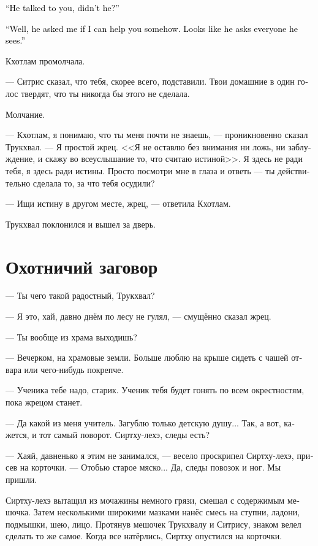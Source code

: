\documentclass[a4paper,12pt,fleqn]{book}\usepackage{cooltooltips}\usepackage{polyglossia}\setdefaultlanguage{russian}\setotherlanguage{english}\defaultfontfeatures{Ligatures=TeX,Mapping=tex-text} \usepackage{xcolor}\definecolor{lightgray}{HTML}{bbbbbb}\color{lightgray}\newcommand{\ml}[3]{\textenglish{\textcolor{black}{#3}}}
\begin{document}
\ml{$0$}
{--- Он с тобой говорил, да?}
{``He talked to you, didn't he?''}

\ml{$0$}
{--- Хай, он спросил, не могу ли я тебе как-то помочь.}
{``Well, he asked me if I can help you somehow.}
\ml{$0$}
{Похоже, он у всех прохожих это спрашивает.}
{Looks like he asks everyone he sees.''}

Кхотлам промолчала.

--- Ситрис сказал, что тебя, скорее всего, подставили.
Твои домашние в один голос твердят, что ты никогда бы этого не сделала.

Молчание.

--- Кхотлам, я понимаю, что ты меня почти не знаешь, --- проникновенно сказал Трукхвал.
--- Я простой жрец.
<<Я не оставлю без внимания ни ложь, ни заблуждение, и скажу во всеуслышание то, что считаю истиной>>.
Я здесь не ради тебя, я здесь ради истины.
Просто посмотри мне в глаза и ответь --- ты действительно сделала то, за что тебя осудили?

--- Ищи истину в другом месте, жрец, --- ответила Кхотлам.

Трукхвал поклонился и вышел за дверь.

\section{Охотничий заговор}

--- Ты чего такой радостный, Трукхвал?

--- Я это, хай, давно днём по лесу не гулял, --- смущённо сказал жрец.

--- Ты вообще из храма выходишь?

--- Вечерком, на храмовые земли.
Больше люблю на крыше сидеть с чашей отвара или чего-нибудь покрепче.

--- Ученика тебе надо, старик.
Ученик тебя будет гонять по всем окрестностям, пока жрецом станет.

--- Да какой из меня учитель.
Загублю только детскую душу...
Так, а вот, кажется, и тот самый поворот.
Сиртху-лехэ, следы есть?

--- Хаяй, давненько я этим не занимался, --- весело проскрипел Сиртху-лехэ, присев на корточки.
--- Отобью старое мяско...
Да, следы повозок и ног.
Мы пришли.

Сиртху-лехэ вытащил из мочажины немного грязи, смешал с содержимым мешочка.
Затем несколькими широкими мазками нанёс смесь на ступни, ладони, подмышки, шею, лицо.
Протянув мешочек Трукхвалу и Ситрису, знаком велел сделать то же самое.
Когда все натёрлись, Сиртху опустился на корточки.
\end{document}
